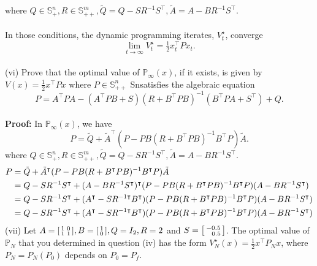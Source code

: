 \documentclass[a4paper,11pt,reqno]{amsart}
\newcommand{\tran}{\intercal}
\begin{document}
where $Q\in \mathbb{S}^n_+, R\in \mathbb{S}^m_{++}, \tilde{Q}=Q-SR^{-1}S^{\tran}, \tilde{A}=A-BR^{-1}S^{\tran}$.
\\ \\
In those conditions, the dynamic programming iterates, $V^{\star}_t$, converge
\begin{equation}
    \lim_{t\to\infty}V^{\star}_{t}=\tfrac{1}{2}x_t^{\tran}Px_t.
\end{equation}
\
\\
(vi) Prove that the optimal value of $\mathbb{P}_{\infty}(x)$, if it exists, is given by $V(x)=\frac{1}{2}x^{\tran}Px$ where $P\in \mathbb{S}^n_{++}$ Snsatisfies the algebraic equation
\begin{equation}
    P=A^{\tran}PA-(A^{\tran}PB+S)(R+B^{\tran}PB)^{-1}(B^{\tran}PA+S^{\tran})+Q.
    \label{eq:P}
\end{equation}
\
\\
\textbf{Proof:} In $\mathbb{P}_{\infty}(x)$, we have
\begin{equation}
    P=\tilde{Q}+\tilde{A}^{\tran}(P-PB(R+B^{\tran}PB)^{-1}B^{\tran}P)\tilde{A}.
\end{equation}
where $Q\in \mathbb{S}^n_+, R\in \mathbb{S}^m_{++}, \tilde{Q}=Q-SR^{-1}S^{\tran}, \tilde{A}=A-BR^{-1}S^{\tran}$.
\begin{align}
    P&=\tilde{Q}+\tilde{A}^{\tran}(P-PB(R+B^{\tran}PB)^{-1}B^{\tran}P)\tilde{A}\notag\\
    &=Q-SR^{-1}S^{\tran}+(A-BR^{-1}S^{\tran})^{\tran}(P-PB(R+B^{\tran}PB)^{-1}B^{\tran}P)(A-BR^{-1}S^{\tran})\notag\\
    &=Q-SR^{-1}S^{\tran}+(A^{\tran}-SR^{-1\tran}B^{\tran})(P-PB(R+B^{\tran}PB)^{-1}B^{\tran}P)(A-BR^{-1}S^{\tran})\notag\\
    &=Q-SR^{-1}S^{\tran}+(A^{\tran}-SR^{-1\tran}B^{\tran})(P-PB(R+B^{\tran}PB)^{-1}B^{\tran}P)(A-BR^{-1}S^{\tran})\notag\\
\end{align}
(vii) Let $A = \begin{bsmallmatrix}1&0\\1&1\end{bsmallmatrix}, B = \begin{bsmallmatrix}1\\0\end{bsmallmatrix}, Q = I_2, R = 2$ and $S=\begin{bsmallmatrix}-0.5\\ \ \ 0.5\end{bsmallmatrix}$. The optimal value of $\mathbb{P}_N$ that you determined in question (iv) has the form $V^{\star}_N(x)=\frac{1}{2}x^{\tran}P_Nx$, where $P_N = P_N(P_0)$ depends on $P_0 = P_f$.
\end{document}

